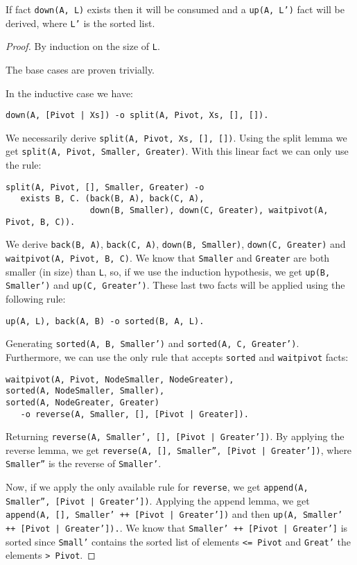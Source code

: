\begin{theorem}
If fact \texttt{down(A, L)} exists then it will be consumed and a \texttt{up(A,
L')} fact will be derived, where \texttt{L'} is the sorted list.
\end{theorem}
\begin{proof}
By induction on the size of \texttt{L}.

The base cases are proven trivially.

In the inductive case we have:
\begin{Verbatim}[fontsize=\scriptsize]
down(A, [Pivot | Xs]) -o split(A, Pivot, Xs, [], []).
\end{Verbatim}

We necessarily derive \texttt{split(A, Pivot, Xs, [], [])}. Using the split
lemma we get \texttt{split(A, Pivot, Smaller, Greater)}. With this linear fact
we can only use the rule:

\begin{Verbatim}[fontsize=\scriptsize]
split(A, Pivot, [], Smaller, Greater) -o
   exists B, C. (back(B, A), back(C, A),
                 down(B, Smaller), down(C, Greater), waitpivot(A, Pivot, B, C)).
\end{Verbatim}

We derive \texttt{back(B, A)}, \texttt{back(C, A)}, \texttt{down(B, Smaller)},
\texttt{down(C, Greater)} and \texttt{waitpivot(A, Pivot, B, C)}. We know that
\texttt{Smaller} and \texttt{Greater} are both smaller (in size) than
\texttt{L}, so, if we use the induction hypothesis, we get \texttt{up(B,
Smaller')} and \texttt{up(C, Greater')}.  These last two facts will be applied
using the following rule:

\begin{Verbatim}[fontsize=\scriptsize]
up(A, L), back(A, B) -o sorted(B, A, L).
\end{Verbatim}

Generating \texttt{sorted(A, B, Smaller')} and \texttt{sorted(A, C, Greater')}.
Furthermore, we can use the only rule that accepts \texttt{sorted} and
\texttt{waitpivot} facts:

\begin{Verbatim}[fontsize=\scriptsize]
waitpivot(A, Pivot, NodeSmaller, NodeGreater),
sorted(A, NodeSmaller, Smaller),
sorted(A, NodeGreater, Greater)
   -o reverse(A, Smaller, [], [Pivot | Greater]).
\end{Verbatim}

Returning \texttt{reverse(A, Smaller', [], [Pivot | Greater'])}. By applying the
reverse lemma, we get \texttt{reverse(A, [], Smaller'', [Pivot | Greater'])},
where \texttt{Smaller''} is the reverse of \texttt{Smaller'}.

Now, if we apply the only available rule for \texttt{reverse}, we get
\texttt{append(A, Smaller'', [Pivot | Greater'])}. Applying the append lemma, we
get \texttt{append(A, [], Smaller' ++ [Pivot | Greater'])} and then
\texttt{up(A, Smaller' ++ [Pivot | Greater']).}. We know that \texttt{Smaller'
++ [Pivot | Greater']} is sorted since \texttt{Small'} contains the sorted list
of elements \texttt{<= Pivot} and \texttt{Great'} the elements \texttt{> Pivot}.

\end{proof}

